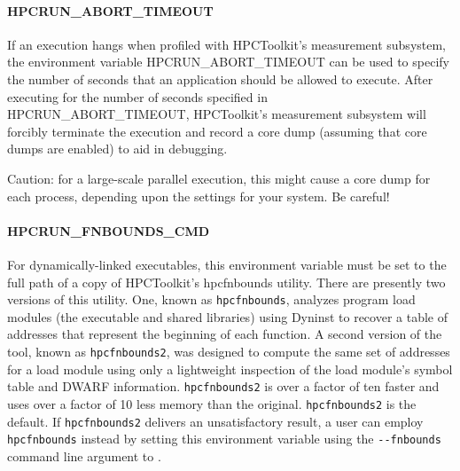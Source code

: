 \paragraph{HPCRUN\_ABORT\_TIMEOUT}

If an execution hangs when profiled with HPCToolkit's measurement
subsystem, the environment variable HPCRUN\_ABORT\_TIMEOUT can be
used to specify the number of seconds that an application should
be allowed to execute. After executing for the number of seconds
specified in HPCRUN\_ABORT\_TIMEOUT, HPCToolkit's measurement
subsystem will forcibly terminate the execution and record a core
dump (assuming that core dumps are enabled) to aid in debugging.

\parg
Caution: for a large-scale parallel execution, this might cause a
core dump for each process, depending upon the settings for your
system. Be careful!

\paragraph{HPCRUN\_FNBOUNDS\_CMD}

For dynamically-linked executables, this environment variable must
be set to the full path of a copy of HPCToolkit's hpcfnbounds
utility. There are presently two versions of this utility. One, known as \verb|hpcfnbounds|, analyzes program load modules (the executable and shared libraries) using Dyninst to recover a table of addresses that represent the beginning of each function. A second version of the tool, known as \verb|hpcfnbounds2|, was designed to compute  the same set of addresses for a load module using only a lightweight inspection of the load module's symbol table and DWARF information. \verb|hpcfnbounds2| is over a factor of ten faster and uses over a factor of 10 less memory than the original. \verb|hpcfnbounds2|  is the default. If \verb|hpcfnbounds2| delivers an unsatisfactory result, a user can employ \verb|hpcfnbounds| instead by setting this environment variable using the \verb|--fnbounds| command line argument to \hpcrun{}.


